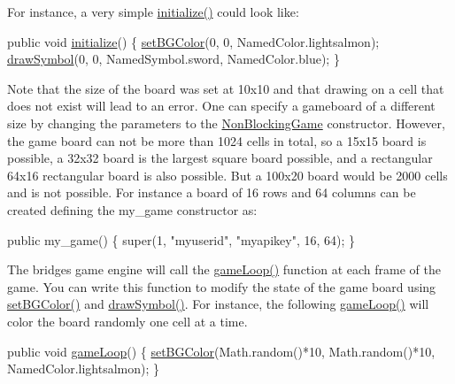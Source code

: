 For instance, a very simple \mbox{\hyperlink{classbridges_1_1games_1_1_game_base_a973a52d5eee7c29b01d668fba3c61657}{initialize()}} could look like\+: 
\begin{DoxyCode}
\textcolor{keyword}{public} \textcolor{keywordtype}{void} \mbox{\hyperlink{classbridges_1_1games_1_1_game_base_a973a52d5eee7c29b01d668fba3c61657}{initialize}}() \{
  \mbox{\hyperlink{classbridges_1_1games_1_1_game_base_a7b4d08cdb306a5bf7104ab5315acb414}{setBGColor}}(0, 0, NamedColor.lightsalmon);
  \mbox{\hyperlink{classbridges_1_1games_1_1_game_base_a03e8446feb00d5957a7e160a4fa76342}{drawSymbol}}(0, 0, NamedSymbol.sword, NamedColor.blue);
\}
\end{DoxyCode}


Note that the size of the board was set at 10x10 and that drawing on a cell that does not exist will lead to an error. One can specify a gameboard of a different size by changing the parameters to the \mbox{\hyperlink{classbridges_1_1games_1_1_non_blocking_game}{Non\+Blocking\+Game}} constructor. However, the game board can not be more than 1024 cells in total, so a 15x15 board is possible, a 32x32 board is the largest square board possible, and a rectangular 64x16 rectangular board is also possible. But a 100x20 board would be 2000 cells and is not possible. For instance a board of 16 rows and 64 columns can be created defining the my\+\_\+game constructor as\+:


\begin{DoxyCode}
\textcolor{keyword}{public} my\_game() \{ super(1, \textcolor{stringliteral}{"myuserid"},  \textcolor{stringliteral}{"myapikey"}, 16, 64); \}
\end{DoxyCode}


The bridges game engine will call the \mbox{\hyperlink{classbridges_1_1games_1_1_game_base_a56d05ed744791cfc1c3792f39ff438f1}{game\+Loop()}} function at each frame of the game. You can write this function to modify the state of the game board using \mbox{\hyperlink{classbridges_1_1games_1_1_game_base_a7b4d08cdb306a5bf7104ab5315acb414}{set\+B\+G\+Color()}} and \mbox{\hyperlink{classbridges_1_1games_1_1_game_base_a03e8446feb00d5957a7e160a4fa76342}{draw\+Symbol()}}. For instance, the following \mbox{\hyperlink{classbridges_1_1games_1_1_game_base_a56d05ed744791cfc1c3792f39ff438f1}{game\+Loop()}} will color the board randomly one cell at a time.


\begin{DoxyCode}
\textcolor{keyword}{public} \textcolor{keywordtype}{void} \mbox{\hyperlink{classbridges_1_1games_1_1_game_base_a56d05ed744791cfc1c3792f39ff438f1}{gameLoop}}() \{
  \mbox{\hyperlink{classbridges_1_1games_1_1_game_base_a7b4d08cdb306a5bf7104ab5315acb414}{setBGColor}}(Math.random()*10, Math.random()*10, NamedColor.lightsalmon);
\}
\end{DoxyCode}


